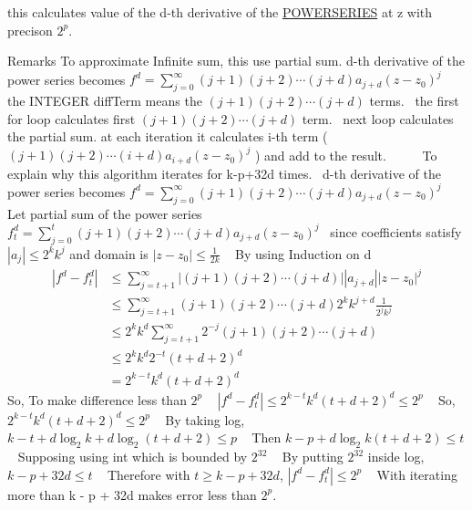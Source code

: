 this calculates value of the d-\/th derivative of the \mbox{\hyperlink{classi_r_r_a_m_1_1_p_o_w_e_r_s_e_r_i_e_s}{P\+O\+W\+E\+R\+S\+E\+R\+I\+ES}} at z with precison $2^p$. 

\begin{DoxyRemark}{Remarks}
To approximate Infinite sum, this use partial sum. d-\/th derivative of the power series becomes $ f^{d} = \displaystyle\sum_{j=0}^{\infty}{(j+1)(j+2) \cdots (j+d) a_{j+d} (z - z_0)^j} $ ~\newline
the I\+N\+T\+E\+G\+ER diff\+Term means the $ (j+1)(j+2) \cdots (j+d) $ terms.~\newline
the first for loop calculates first $ (j+1)(j+2) \cdots (j+d) $ term.~\newline
next loop calculates the partial sum. at each iteration it calculates i-\/th term ( $ (j+1)(j+2) \cdots (i+d) a_{i+d} (z - z_0)^j$ ) and add to the result. ~\newline
~\newline
~\newline
To explain why this algorithm iterates for k-\/p+32d times.~\newline
d-\/th derivative of the power series becomes $ f^{d} = \displaystyle\sum_{j=0}^{\infty}{(j+1)(j+2) \cdots (j+d) a_{j+d} (z - z_0)^j} $ ~\newline
Let partial sum of the power series $ f^{d}_{t} = \displaystyle\sum_{j=0}^{t}{(j+1)(j+2) \cdots (j+d) a_{j+d} (z - z_0)^j} $~\newline
since coefficients satisfy $ |a_j| \leq 2^k k^j $ and domain is $ |z - z_0| \leq \frac{1}{2k}$ ~\newline
By using Induction on d \begin{align*} |f^{d} - f^{d}_{t} | &\leq \displaystyle\sum_{j=t+1}^{\infty} {|(j+1)(j+2) \cdots (j+d)| |a_{j+d}| |z-z_0|^j }\\ &\leq \displaystyle\sum_{j=t+1}^{\infty} {(j+1)(j+2) \cdots (j+d) 2^k k^{j+d} \frac{1}{2^j k^j} }\\ &\leq 2^k k^d \displaystyle\sum_{j=t+1}^{\infty} {2^{-j} (j+1)(j+2) \cdots (j+d) }\\ &\leq 2^k k^d 2^{-t} (t+d+2)^d \\ &= 2^{k-t} k^d (t+d+2)^d \end{align*} So, To make difference less than $2^p$ ~\newline
 $ |f^{d} - f^{d}_{t} | \leq 2^{k-t} k^d (t+d+2)^d \leq 2^p $ ~\newline
So, $ 2^{k-t} k^d (t+d+2)^d \leq 2^p $ ~\newline
By taking log, $ k-t + d\log_{2}{k} + d \log_{2}{(t+d+2)} \leq p $ ~\newline
Then $ k - p + d\log_{2}{k(t+d+2)} \leq t $ ~\newline
Supposing using int which is bounded by $ 2^{32} $ ~\newline
By putting $2^{32}$ inside log, $ k - p + 32d \leq t$ ~\newline
Therefore with $ t \geq k - p + 32d $, $ |f^{d} - f^{d}_{t} | \leq 2^p $ ~\newline
With iterating more than k -\/ p + 32d makes error less than $2^p$.
\end{DoxyRemark}
